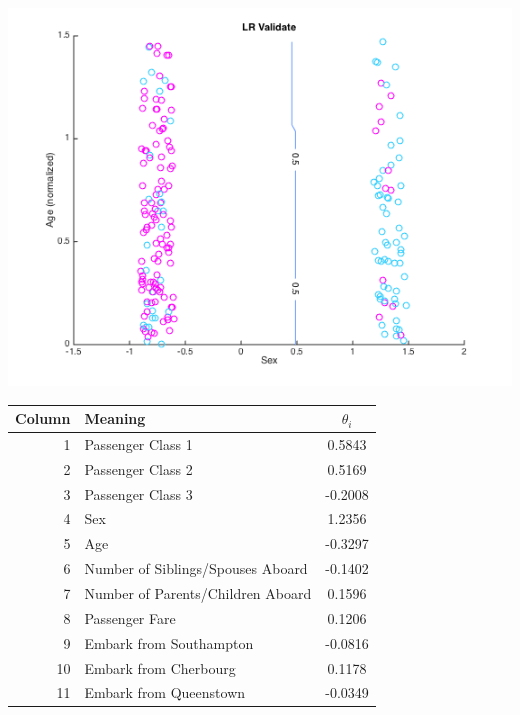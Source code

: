 \documentclass[10pt,letterpaper]{article}
\begin{document}
\begin{minipage}{\textwidth}
\begin{minipage}[b]{.4\textwidth}
\centering
\includegraphics[width=\linewidth]{figures/titanic45.png}
\label{sexagelr}
\end{minipage}
\hfill
\begin{minipage}[b]{.59\textwidth}
\centering
\begin{tabular}{rlc}
Column & Meaning                           & $\theta_i$\\ \hline
1      & Passenger Class 1                 & 0.5843  \\
2      & Passenger Class 2                 & 0.5169  \\
3      & Passenger Class 3                 & -0.2008 \\
4      & Sex                               & 1.2356    \\
5      & Age                               & -0.3297 \\
6      & Number of Siblings/Spouses Aboard & -0.1402 \\
7      & Number of Parents/Children Aboard & 0.1596  \\
8      & Passenger Fare                    & 0.1206   \\
9      & Embark from Southampton           & -0.0816 \\
10     & Embark from Cherbourg             & 0.1178  \\
11     & Embark from Queenstown            & -0.0349  \\
\end{tabular}

\end{minipage}

\end{minipage}
\end{document}
